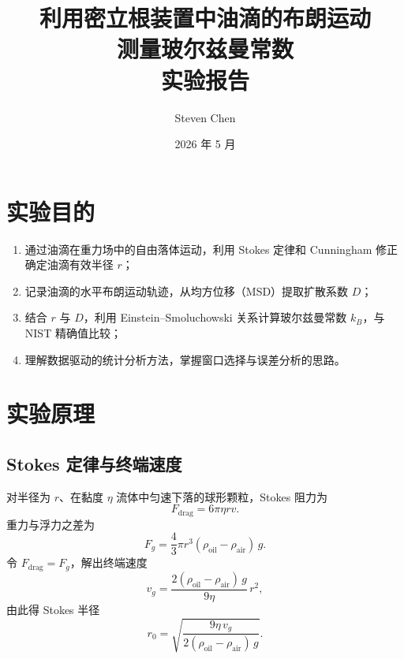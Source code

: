 \documentclass[12pt,a4paper]{ctexart}
\title{\textbf{利用密立根装置中油滴的布朗运动\\测量玻尔兹曼常数}\\[6pt]
\large 实验报告}
\author{Steven Chen}
\date{2026 年 5 月}
\begin{document}
\maketitle
\tableofcontents
\newpage

\section{实验目的}

\begin{enumerate}[leftmargin=2em]
  \item 通过油滴在重力场中的自由落体运动，利用 Stokes 定律和 Cunningham 修正确定油滴有效半径 $r$；
  \item 记录油滴的水平布朗运动轨迹，从均方位移（MSD）提取扩散系数 $D$；
  \item 结合 $r$ 与 $D$，利用 Einstein--Smoluchowski 关系计算玻尔兹曼常数 $k_B$，与 NIST 精确值比较；
  \item 理解数据驱动的统计分析方法，掌握窗口选择与误差分析的思路。
\end{enumerate}

\section{实验原理}

\subsection{Stokes 定律与终端速度}

对半径为 $r$、在黏度 $\eta$ 流体中匀速下落的球形颗粒，Stokes 阻力为
\begin{equation}
  F_\text{drag} = 6\pi \eta r v.
\end{equation}
重力与浮力之差为
\begin{equation}
  F_g = \frac{4}{3}\pi r^3 (\rho_\text{oil} - \rho_\text{air})\, g.
\end{equation}
令 $F_\text{drag} = F_g$，解出终端速度
\begin{equation}
  v_g = \frac{2(\rho_\text{oil}-\rho_\text{air})\,g}{9\eta}\,r^2,
  \label{eq:stokes_vg}
\end{equation}
由此得 Stokes 半径
\begin{equation}
  r_0 = \sqrt{\frac{9\eta\,v_g}{2(\rho_\text{oil}-\rho_\text{air})\,g}}.
  \label{eq:r_stokes}
\end{equation}
\end{document}
